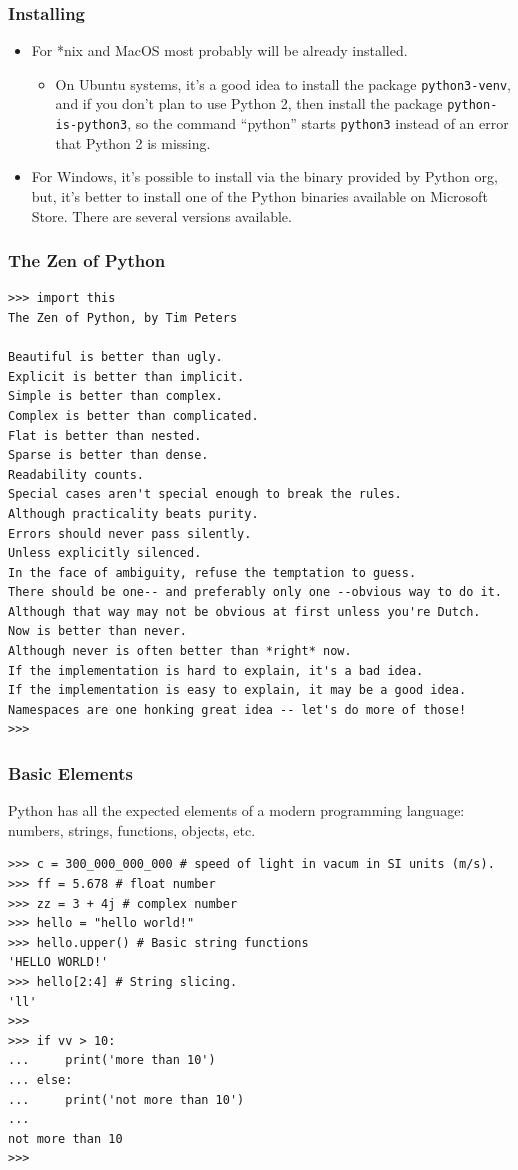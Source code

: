 \documentclass[aspectratio=169]{beamer}
\begin{document}
\begin{frame}
\frametitle{Installing}
    \begin{itemize}
        \item For *nix and MacOS most probably will be already installed.
        \begin{itemize}
            \item On Ubuntu systems, it's a good idea to install the package \texttt{python3-venv}, and if you don't plan to use Python 2, then install the package \texttt{python-is-python3}, so the command ``python'' starts \texttt{python3} instead of an error that Python 2 is missing.
        \end{itemize}
        \item For Windows, it's possible to install via the binary provided by Python org, but, it's better to install one of the Python binaries available on Microsoft Store. There are several versions available.
    \end{itemize}
\end{frame}


\begin{frame}[fragile]
\frametitle{The Zen of Python}
\scriptsize
\begin{verbatim}
>>> import this
The Zen of Python, by Tim Peters

Beautiful is better than ugly.
Explicit is better than implicit.
Simple is better than complex.
Complex is better than complicated.
Flat is better than nested.
Sparse is better than dense.
Readability counts.
Special cases aren't special enough to break the rules.
Although practicality beats purity.
Errors should never pass silently.
Unless explicitly silenced.
In the face of ambiguity, refuse the temptation to guess.
There should be one-- and preferably only one --obvious way to do it.
Although that way may not be obvious at first unless you're Dutch.
Now is better than never.
Although never is often better than *right* now.
If the implementation is hard to explain, it's a bad idea.
If the implementation is easy to explain, it may be a good idea.
Namespaces are one honking great idea -- let's do more of those!
>>>
\end{verbatim}
\normalsize
\end{frame}

\begin{frame}[fragile]
\frametitle{Basic Elements}
Python has all the expected elements of a modern programming language: numbers, strings, functions, objects, etc.
\scriptsize

\begin{verbatim}
>>> c = 300_000_000_000 # speed of light in vacum in SI units (m/s).
>>> ff = 5.678 # float number
>>> zz = 3 + 4j # complex number
>>> hello = "hello world!"
>>> hello.upper() # Basic string functions
'HELLO WORLD!'
>>> hello[2:4] # String slicing.
'll'
>>>
>>> if vv > 10:
...     print('more than 10')
... else:
...     print('not more than 10')
...
not more than 10
>>>
\end{verbatim}
\normalsize
\end{frame}
\end{document}
